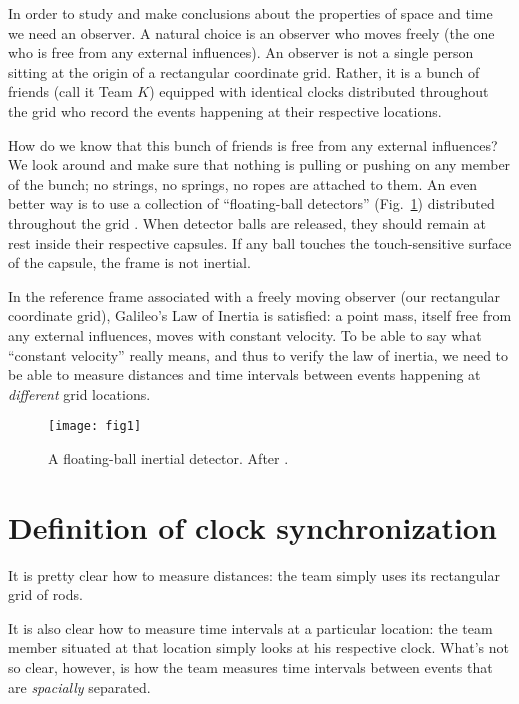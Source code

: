 \documentclass[twocolumn,preprintnumbers,amsmath,amssymb,final]{revtex4}
\begin{document}
In order to study and make conclusions about the properties of space and time 
we need an observer. 
A natural choice is an observer who moves freely (the one who is free from any 
external influences).
An observer is not a single person sitting at the origin of a rectangular coordinate grid. 
Rather, it is a bunch of friends (call it Team $K$) equipped with identical clocks distributed 
throughout the grid who record the events happening at their respective locations.  

How do we know that this bunch of friends is free from any external influences? 
We look around and make sure that nothing is pulling or pushing on any member 
of the bunch; no strings, no springs, no ropes are attached to them. 
An even better way is to use a collection of ``floating-ball detectors'' (Fig.\ \ref{fig:1})
distributed throughout the grid \cite{MOORE2003}. When detector balls are released, 
they should remain at rest inside their respective capsules. If any ball touches the 
touch-sensitive surface of the capsule, the frame is not inertial. 


In the reference frame associated with a freely moving observer (our rectangular 
coordinate grid), Galileo's Law of Inertia is satisfied: a point mass, itself free from 
any external influences, moves with constant velocity. To be able to say 
what ``constant velocity'' really means, and thus to verify the law of inertia, we
need to be able to measure distances and time intervals between events happening 
at {\it different} grid locations.
 
\begin{figure}[!ht]
\texttt{[image: fig1]}
\caption{ \label{fig:1} 
A floating-ball inertial detector. After \cite{MOORE2003}.
}
\end{figure}

\section*{Definition of clock synchronization}

It is pretty clear how to measure distances: the team simply uses its rectangular 
grid of rods.

It is also clear how to measure time intervals at a particular location: 
the team member situated at that location simply looks at his respective clock.
What's not so clear, however, is how the team measures time intervals between 
events that are {\it spacially} separated.
\end{document}
